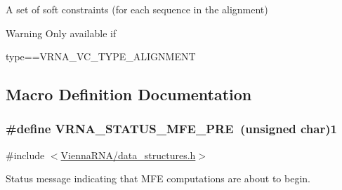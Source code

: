 A set of soft constraints (for each sequence in the alignment) 

\begin{DoxyWarning}{Warning}
Only available if\begin{DoxyVerb}type==VRNA_VC_TYPE_ALIGNMENT \end{DoxyVerb}
 
\end{DoxyWarning}


\subsection{Macro Definition Documentation}
\hypertarget{group__fold__compound_ga1a5053dc8acbb0111e852988726f07d6}{
\subsubsection[{V\-R\-N\-A\-\_\-\-S\-T\-A\-T\-U\-S\-\_\-\-M\-F\-E\-\_\-\-P\-R\-E}]{\setlength{\rightskip}{0pt plus 5cm}\#define V\-R\-N\-A\-\_\-\-S\-T\-A\-T\-U\-S\-\_\-\-M\-F\-E\-\_\-\-P\-R\-E~(unsigned char)1}}\label{group__fold__compound_ga1a5053dc8acbb0111e852988726f07d6}


{\ttfamily \#include $<$\hyperlink{data__structures_8h}{Vienna\-R\-N\-A/data\-\_\-structures.\-h}$>$}



Status message indicating that M\-F\-E computations are about to begin. 


